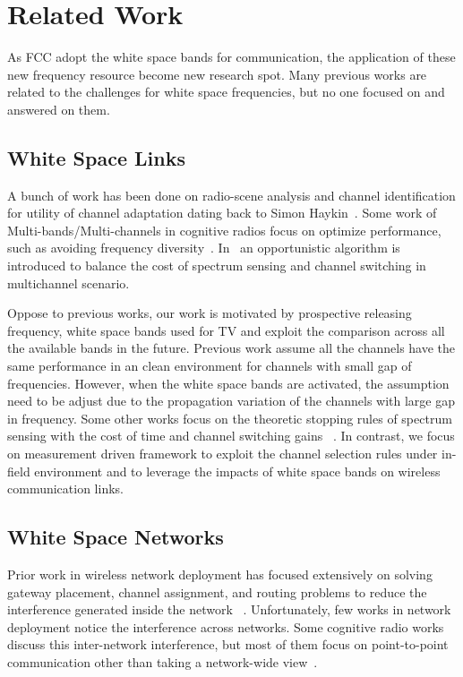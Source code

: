 \chapter{Related Work} 
\label{sec:related}

As FCC adopt the white space bands for communication, the application
of these new frequency resource become new research spot. Many previous
works are related to the challenges for white space frequencies, but
no one focused on and answered on them.

\section{White Space Links}
\label{subsec:related_whitelinks}

A bunch of work has been done on radio-scene analysis and channel 
identification for utility of channel adaptation dating back to 
Simon Haykin~\cite{haykin2005cognitive}. Some work of Multi-bands/Multi-channels 
in cognitive radios focus on optimize performance, such as avoiding 
frequency diversity~\cite{rahul2009frequency}. In~\cite{OAR} an opportunistic 
algorithm is introduced to balance the cost of spectrum sensing and channel
switching in multichannel scenario.

Oppose to previous works, our work is motivated by prospective releasing 
frequency, white space bands used for TV and exploit the comparison 
across all the available bands in the future. Previous work assume 
all the channels have the same performance in an clean environment 
for channels with small gap of frequencies. However, when the white space
bands are activated, the assumption need to be adjust due to the propagation
variation of the channels with large gap in frequency. 
Some other works focus on the theoretic stopping rules of spectrum 
sensing with the cost of time and channel switching gains
~\cite{sabharwal2007opportunistic, OAR}. In contrast, we focus on
measurement driven framework to exploit the channel selection
rules under in-field environment and to leverage the impacts of 
white space bands on wireless communication links.

\section{White Space Networks}
\label{sec:related_subwhitemesh}

Prior work in wireless network deployment has focused extensively on 
solving gateway placement, channel assignment, and routing problems 
to reduce the interference generated inside the network
~\cite{he2008optimizing,ramachandran2006interference,akyildiz2006next}.
Unfortunately, few works in network deployment notice the interference 
across networks. Some cognitive radio works discuss this inter-network 
interference, but most of them focus on point-to-point communication 
other than taking a network-wide view~\cite{cabric2004implementation}.
 
